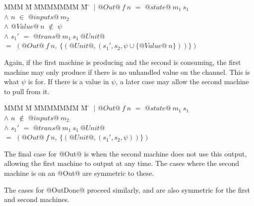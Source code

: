 \begin{tabbing}
MMM \= M \= MMMMMMM \= M \=\kill
 \> $~|$ \> $@Out@~f~n$ \> $=$ \> $@state@~m_1~s_1$ \\
 \> $\wedge$ \> $n$      \> $\in$ \> $@inputs@~m_2$ \\
 \> $\wedge$ \> $@Value@~n$ \> $\not\in$ \> $\psi$ \\
 \> $\wedge$ \> $s_1'$     \> $=$ \> $@trans@~m_1~s_1~@Unit@$ \\
 \> $=$ \> $(@Out@~f~n,~\{(@Unit@, (s_1',s_2,\psi \cup \{@Value@~n\} ))\})$ \\
\end{tabbing}

Again, if the first machine is producing and the second is consuming, the first machine may only produce if there is no unhandled value on the channel.
This is what $\psi$ is for.
If there is a value in $\psi$, a later case may allow the second machine to pull from it.

\begin{tabbing}
MMM \= M \= MMMMMMM \= M \=\kill
 \> $~|$ \> $@Out@~f~n$ \> $=$ \> $@state@~m_1~s_1$ \\
 \> $\wedge$ \> $n$      \> $\not\in$ \> $@inputs@~m_2$ \\
 \> $\wedge$ \> $s_1'$     \> $=$ \> $@trans@~m_1~s_1~@Unit@$ \\
 \> $=$ \> $(@Out@~f~n,~\{(@Unit@, (s_1',s_2,\psi))\})$ \\
\end{tabbing}

The final case for @Out@ is when the second machine does not use this output, allowing the first machine to output at any time.
The cases where the second machine is on an @Out@ are symmetric to these.

The cases for @OutDone@ proceed similarly, and are also symmetric for the first and second machines.

